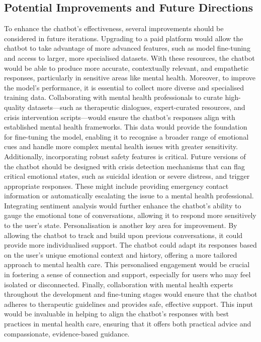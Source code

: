 \subsection*{Potential Improvements and Future Directions} 
To enhance the chatbot’s effectiveness, several improvements should be considered in future iterations. Upgrading to a paid platform would allow the chatbot to take advantage of more advanced features, such as model fine-tuning and access to larger, more specialised datasets. With these resources, the chatbot would be able to produce more accurate, contextually relevant, and empathetic responses, particularly in sensitive areas like mental health.
Moreover, to improve the model’s performance, it is essential to collect more diverse and specialised training data. Collaborating with mental health professionals to curate high-quality datasets—such as therapeutic dialogues, expert-curated resources, and crisis intervention scripts—would ensure the chatbot’s responses align with established mental health frameworks. This data would provide the foundation for fine-tuning the model, enabling it to recognise a broader range of emotional cues and handle more complex mental health issues with greater sensitivity.
Additionally, incorporating robust safety features is critical. Future versions of the chatbot should be designed with crisis detection mechanisms that can flag critical emotional states, such as suicidal ideation or severe distress, and trigger appropriate responses. These might include providing emergency contact information or automatically escalating the issue to a mental health professional. Integrating sentiment analysis would further enhance the chatbot’s ability to gauge the emotional tone of conversations, allowing it to respond more sensitively to the user’s state.
Personalisation is another key area for improvement. By allowing the chatbot to track and build upon previous conversations, it could provide more individualised support. The chatbot could adapt its responses based on the user’s unique emotional context and history, offering a more tailored approach to mental health care. This personalised engagement would be crucial in fostering a sense of connection and support, especially for users who may feel isolated or disconnected.
Finally, collaboration with mental health experts throughout the development and fine-tuning stages would ensure that the chatbot adheres to therapeutic guidelines and provides safe, effective support. This input would be invaluable in helping to align the chatbot’s responses with best practices in mental health care, ensuring that it offers both practical advice and compassionate, evidence-based guidance.